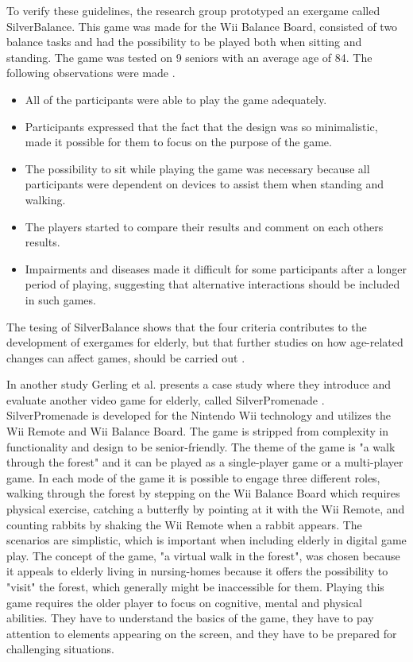To verify these guidelines, the research group prototyped an exergame called SilverBalance. This game was made for the Wii Balance Board, consisted of two balance tasks and had the possibility to be played both when sitting and standing. The game was tested on 9 seniors with an average age of 84. The following observations were made \cite{gerling1}.
\begin{itemize}
\item All of the participants were able to play the game adequately. 
\item Participants expressed that the fact that the design was so minimalistic, made it possible for them to focus on the purpose of the game. 
\item The possibility to sit while playing the game was necessary because all participants were dependent on devices to assist them when standing and walking.
\item The players started to compare their results and comment on each others results.
\item Impairments and diseases made it difficult for some participants after a longer period of playing, suggesting that alternative interactions should be included in such games.
\end{itemize}

The tesing of SilverBalance shows that the four criteria contributes to the development of exergames for elderly, but that further studies on how age-related changes can affect games, should be carried out \cite{gerling1}.

In another study Gerling et al. presents a case study where they introduce and evaluate another video game for elderly, called SilverPromenade \cite{gerling2}.  SilverPromenade is developed for the Nintendo Wii technology and utilizes the Wii Remote and Wii Balance Board. The game is stripped from complexity in functionality and design to be senior-friendly. The theme of the game is "a walk through the forest" and it can be played as a single-player game or a multi-player game. In each mode of the game it is possible to engage three different roles, walking through the forest by stepping on the Wii Balance Board which requires physical exercise, catching a butterfly by pointing at it with the Wii Remote, and counting rabbits by shaking the Wii Remote when a rabbit appears. The scenarios are simplistic, which is important when including elderly in digital game play. The concept of the game, "a virtual walk in the forest", was chosen because it appeals to elderly living in nursing-homes because it offers the possibility to "visit" the forest, which generally might be inaccessible for them. Playing this game requires the older player to focus on cognitive, mental and physical abilities. They have to understand the basics of the game, they have to pay attention to elements appearing on the screen, and they have to be prepared for challenging situations. 

